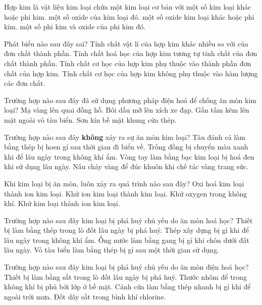 \documentclass[11pt,a4paper]{article}
\def\loigiai#1{}
\begin{document}
\begin{ex}
Hợp kim là vật liệu kim loại chứa một kim loại cơ bản với
\choice
{một số kim loại khác hoặc phi kim.}
{một số oxide của kim loại đó.}
{một số oxide kim loại khác hoặc phi kim.}
{một số phi kim và oxide của phi kim đó.}
\loigiai{}
\end{ex}

\begin{ex}
Phát biểu nào sau đây sai?
\choice
{Tính chất vật lí của hợp kim khác nhiều so với của đơn chất thành phần.}
{Tính chất hoá học của hợp kim tương tự tính chất của đơn chất thành phần.}
{Tính chất cơ học của hợp kim phụ thuộc vào thành phần đơn chất của hợp kim.}
{Tính chất cơ học của hợp kim không phụ thuộc vào hàm lượng các đơn chất.}
\loigiai{}
\end{ex}

\begin{ex}
Trường hợp nào sau đây đã sử dụng phương pháp điện hoá để chống ăn mòn kim loại?
\choice
{Mạ vàng lên quai đồng hồ.}
{Bôi dầu mỡ lên xích xe đạp.}
{Gắn tấm kẽm lên mặt ngoài vỏ tàu biển.}
{Sơn kín bề mặt khung cửa thép.}
\loigiai{}
\end{ex}

\begin{ex}
Trường hợp nào sau đây \textbf{không} xảy ra sự ăn mòn kim loại?
\choice
{Tàu đánh cá làm bằng thép bị hoen gỉ sau thời gian đi biển về.}
{Trống đồng bị chuyển màu xanh khi để lâu ngày trong không khí ẩm.}
{Vòng tay làm bằng bạc kim loại bị hoá đen khi sử dụng lâu ngày.}
{Nấu chảy vàng để đúc khuôn khi chế tác vàng trang sức.}
\loigiai{}
\end{ex}

\begin{ex}
Khi kim loại bị ăn mòn, luôn xảy ra quá trình nào sau đây?
\choice
{Oxi hoá kim loại thành ion kim loại.}
{Khử ion kim loại thành kim loại.}
{Khử oxygen trong không khí.}
{Khử kim loại thành ion kim loại.}
\loigiai{}
\end{ex}

\begin{ex}
Trường hợp nào sau đây kim loại bị phá huỷ chủ yếu do ăn mòn hoá học?
\choice
{Thiết bị làm bằng thép trong lò đốt lâu ngày bị phá huỷ.}
{Thép xây dựng bị gỉ khi để lâu ngày trong không khí ẩm.}
{Ống nước làm bằng gang bị gỉ khi chôn dưới đất lâu ngày.}
{Vỏ tàu biển làm bằng thép bị gỉ sau một thời gian sử dụng.}
\loigiai{}
\end{ex}

\begin{ex}
Trường hợp nào sau đây kim loại bị phá huỷ chủ yếu do ăn mòn điện hoá học?
\choice
{Thiết bị làm bằng sắt trong lò đốt lâu ngày bị phá huỷ.}
{Thước nhôm để trong không khí bị phủ bởi lớp  ở bề mặt.}
{Cánh cửa làm bằng thép nhanh bị gỉ khi để ngoài trời mưa.}
{Đốt dây sắt trong bình khí chlorine.}
\loigiai{}
\end{ex}
\end{document}
